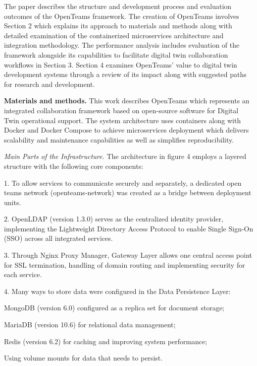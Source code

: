 \begin{multicols}{2}
The paper describes the structure and development process and evaluation
outcomes of the OpenTeams framework. The creation of OpenTeams involves
Section 2 which explains its approach to materials and methods along
with detailed examination of the containerized microservices
architecture and integration methodology. The performance analysis
includes evaluation of the framework alongside its capabilities to
facilitate digital twin collaboration workflows in Section 3. Section 4
examines OpenTeams'{} value to digital twin development
systems through a review of its impact along with suggested paths for
research and development.

{\bfseries Materials and methods.} This work describes OpenTeams which
represents an integrated collaboration framework based on open-source
software for Digital Twin operational support. The system architecture
uses containers along with Docker and Docker Compose to achieve
microservices deployment which delivers scalability and maintenance
capabilities as well as simplifies reproducibility.
\end{multicols}


\begin{multicols}{2}
\emph{Main Parts of the Infrastructure.} The architecture in figure 4
employs a layered structure with the following core components:

1. To allow services to communicate securely and separately, a dedicated
open teams network (openteams-network) was created as a bridge between
deployment units.

2. OpenLDAP (version 1.3.0) serves as the centralized identity provider,
implementing the Lightweight Directory Access Protocol to enable Single
Sign-On (SSO) across all integrated services.

3. Through Nginx Proxy Manager, Gateway Layer allows one central access
point for SSL termination, handling of domain routing and implementing
security for each service.

4. Many ways to store data were configured in the Data Persistence
Layer:

MongoDB (version 6.0) configured as a replica set for document storage;

MariaDB (version 10.6) for relational data management;

Redis (version 6.2) for caching and improving system performance;

Using volume mounts for data that needs to persist.
\end{multicols}

